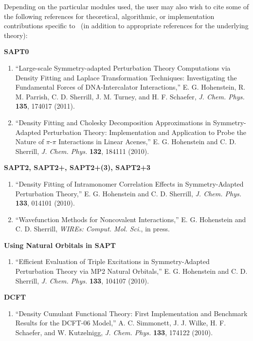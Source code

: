 \begin{quotation}
\noindent

\end{quotation}

Depending on the particular modules used, the user may also wish to
cite some of the following references for theoretical, algorithmic,
or implementation contributions specific to \PSIfour\ (in addition to
appropriate references for the underlying theory):

{\bf SAPT0} 
\begin{enumerate}
\item ``Large-scale Symmetry-adapted Perturbation Theory Computations via
  Density Fitting and Laplace Transformation Techniques: Investigating the
  Fundamental Forces of {DNA}-Intercalator Interactions,'' E. G. Hohenstein,
  R. M. Parrish, C. D. Sherrill, J. M. Turney, and H. F. Schaefer, {\em J.
  Chem. Phys.} {\bf 135}, 174017 (2011).
\item ``Density Fitting and Cholesky Decomposition Approximations
  in Symmetry-Adapted Perturbation Theory: Implementation and Application
  to Probe the Nature of $\pi$-$\pi$ Interactions in Linear Acenes,''
  E. G. Hohenstein and C. D. Sherrill, {\em J. Chem. Phys.} {\bf 132},
  184111 (2010).
\end{enumerate}

{\bf SAPT2, SAPT2+, SAPT2+(3), SAPT2+3} 
\begin{enumerate}
\item ``Density Fitting of Intramonomer Correlation Effects in
  Symmetry-Adapted Perturbation Theory,''
  E. G. Hohenstein and C. D. Sherrill, {\em J. Chem. Phys.} {\bf 133},
  014101 (2010).
\item ``Wavefunction Methods for Noncovalent Interactions,'' E. G.
  Hohenstein and C. D. Sherrill, {\em WIREs: Comput. Mol. Sci.}, in press.
\end{enumerate}

{\bf Using Natural Orbitals in SAPT} 
\begin{enumerate}
\item ``Efficient Evaluation of Triple Excitations in Symmetry-Adapted
  Perturbation Theory via MP2 Natural Orbitals,'' E. G. Hohenstein
  and C. D. Sherrill, {\em J. Chem. Phys.} {\bf 133}, 104107 (2010).
\end{enumerate}

{\bf DCFT} 
\begin{enumerate}
\item ``Density Cumulant Functional Theory: First Implementation and
  Benchmark Results for the {DCFT-06} Model,'' A. C. Simmonett,
  J. J. Wilke, H. F. Schaefer, and W. Kutzelnigg, {\em J. Chem. Phys.}
  {\bf 133}, 174122 (2010).
\end{enumerate}

